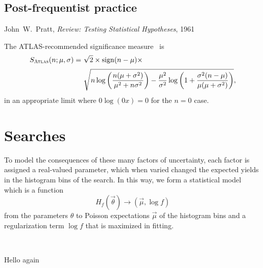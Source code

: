 \begin{singlespacing}
\section{Post-frequentist practice}
\label{sec:searches_practice}
\begin{epigraphs}
%
{John~W.~Pratt,
\textit{Review: Testing Statistical Hypotheses},
1961~\cite{pratt1961testing}}
\end{epigraphs}
\end{singlespacing}


The ATLAS-recommended significance measure~\cite{atlas_significance} is
\begin{align}
\label{eqn:significance_atlas}
S_\mathrm{\textsc{Atlas}}(n; \mu, \sigma) =~&
\sqrt{2} \times
\mathrm{sign}(n - \mu) \times
\\[0.2em] \nonumber
&
\sqrt{
n\log\left(\frac{n(\mu + \sigma^2)}{\mu^2 + n\sigma^2}\right)
- \frac{\mu^2}{\sigma^2}\log\left(
1 + \frac{\sigma^2(n - \mu)}{\mu(\mu + \sigma^2)}
\right)
}
,
\end{align}
in an appropriate limit where $0\log(0x) = 0$ for the $n=0$ case.


\section{Searches}
\label{sec:searches_searches}

To model the consequences of these many factors of uncertainty, each factor is
assigned a real-valued parameter, which when varied changed the expected yields
in the histogram bins of the search.
In this way, we form a statistical model which is a function
\begin{equation}
H_{\!f}(\vec \theta) \rightarrow (\vec \mu, \log f)
\end{equation}
from the parameters $\theta$ to Poisson expectations $\vec\mu$ of the histogram
bins and a regularization term $\log f$ that is maximized in fitting.

\histfactory~\cite{cranmer2012histfactory}
\pyhf~\cite{heinrich2021pyhf}
\histfitter~\cite{Besjes_2015,baak2015histfitter}


\clearpage

Hello again
